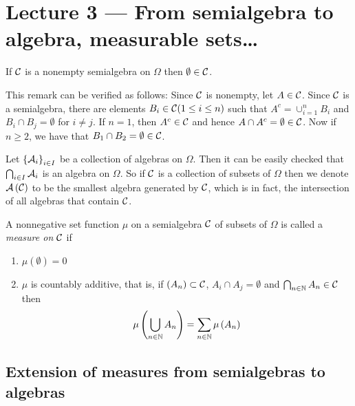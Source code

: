 \section{Lecture 3 --- From semialgebra to algebra, measurable sets\ldots }

\begin{remark}
    If ${\cal C}$ is a nonempty semialgebra on $\Omega$ then $\emptyset \in {\cal C}$.

    This remark can be verified as follows: Since ${\cal C}$ is nonempty, let $A\in{\cal C}$. Since ${\cal C}$ is a semialgebra, there are elements $B_i \in {\cal C} (1\le i \le n)$ such that $A^c = \cup_{i=1}^{n} B_i$ and $B_i \cap B_j = \emptyset$ for $i\ne j$. If $n=1$, then $A^c \in {\cal C}$ and hence $A\cap A^c = \emptyset \in {\cal C}$. Now if $n\ge 2$, we have that $B_1 \cap B_2 = \emptyset \in {\cal C}$.
    \label{rem:empty-in-semialgebra}
\end{remark}

\begin{remark}
    Let $\left\{ {\cal A} _i \right\}_{i \in I}$ be a collection of algebras on $\Omega$. Then it can be easily checked that $\bigcap_{i\in I} {\cal A} _i$ is an algebra on $\Omega$. So if ${\cal C}$ is a collection of subsets of $\Omega$ then we denote ${\cal A} \left( {\cal C} \right)$ to be the smallest algebra generated by ${\cal C}$, which is in fact, the intersection of all algebras that contain ${\cal C}$.
    \label{rem:smallest-algebra}
\end{remark}

\begin{definition}
    A nonnegative set function $\mu$ on a semialgebra ${\cal C}$ of subsets of $\Omega$ is called a \textit{measure on ${\cal C}$} if
    \begin{enumerate}[label= (\roman*)]
	\item $\mu (\emptyset ) = 0$
	\item $\mu$ is countably additive, that is, if $\left( A_n \right) \subset {\cal C}$, $A_i \cap A_j = \emptyset$ and $\bigcap_{n\in \mathbb N} A_n \in {\cal C}$ then 
	    \begin{equation*}
		\mu \left( \bigcup_{n\in \mathbb N} A_n \right) = \sum_{n\in \mathbb N} \mu \left( A_n \right)
		    \end{equation*}

    \end{enumerate}
    \label{def:measure-on-semialgebra}
\end{definition}

\subsection{Extension of measures from semialgebras to algebras}


